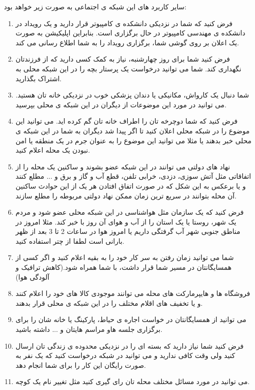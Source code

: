 سایر کاربرد های این شبکه ی اجتماعی به صورت زیر خواهد بود:

\begin{enumerate}
	\item 
	فرض کنید که شما در نزدیکی دانشکده ی کامپیوتر قرار دارید و یک رویداد در دانشکده ی مهندسی کامپیوتر در حال برگزاری است. بنابراین اپلیکیشن به صورت یک اعلان بر روی گوشی شما، برگزاری رویداد را به شما اطلاع رسانی می کند.
	\item 
	فرض کنید شما برای روز چهارشنبه، نیاز به کمک کسی دارید که از فرزندتان نگهداری کند. شما می توانید درخواست یک پرستار بچه را در این شبکه محلی به اشتراک بگذارید.
	
	\item 
	شما دنبال یک کارواش، مکانیکی یا دندان پزشکی خوب در نزدیکی خانه تان هستید. می توانید در مورد این موضوعات از دیگران در این شبکه ی محلی بپرسید.
	\item 
	فرض کنید که شما دوچرخه تان را اطراف خانه تان گم کرده اید. می توانید این موضوع را در شبکه محلی اعلان کنید تا اگر پیدا شد دیگران به شما در این شبکه ی محلی خبر بدهند یا مثلا می توانید این موضوع را به عنوان جرم در یک منطقه یا امن نبودن یک محله اعلام کنید.
	
	\item 
	نهاد های دولتی می توانند در این شبکه عضو بشوند و ساکنین یک محله را از اتفاقاتی مثل آتش سوزی، دزدی، خرابی تلفن، قطع آب و گاز و برق و ... مطلع کنند و یا برعکس به این شکل که در صورت اتفاق افتادن هر یک از این حوادث ساکنین آن محله بتوانند در سریع ترین زمان ممکن نهاد دولتی مربوطه را مطلع سازند.
	
	\item 
	فرض کنید که یک سازمان مثل هواشناسی در این شبکه محلی عضو شود و مردم یک شهر، روستا یا یک استان را از آب و هوای آن روز با خبر کند. مثلا امروز در مناطق جنوبی شهر آب گرفتگی داریم یا امروز هوا در ساعات  2 تا 3 بعد از ظهر بارانی است لطفا از چتر استفاده کنید.
	
	\item
	شما می توانید زمان رفتن به سر کار خود را به بقیه اعلام کنید و اگر کسی از همسایگانتان در مسیر شما قرار داشت، با شما همراه شود.(کاهش ترافیک و آلودگی هوا)
	\item 
	فروشگاه ها و هایپرمارکت های محله می توانند موجودی کالا های خود را اعلام کنند و یا تخفیف های اقلام مختلف را در این شبکه ی محلی قرار بدهند.
	\item 
	می توانید از همسایگانتان در خواست اجاره ی حیاط، پارکینگ یا خانه شان را برای برگزاری جلسه هاو مراسم هایتان و ... داشته باشید.
	\item 
	فرض کنید شما نیاز دارید که بسته ای را در نزدیکی محدوده ی زندگی تان ارسال کنید ولی وقت کافی ندارید و می توانید در شبکه درخواست کنید که یک نفر به صورت رایگان این کار را برای شما انجام دهد.
	\item 
	می توانید در مورد مسائل مختلف محله تان رای گیری کنید مثل تغییر نام یک کوچه.
	 
\end{enumerate}
 
